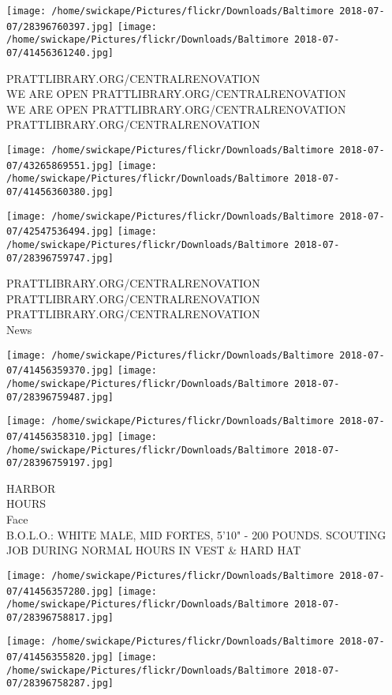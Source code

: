 \documentclass[10pt,letterpaper]{article}
\begin{document}
\texttt{[image: /home/swickape/Pictures/flickr/Downloads/Baltimore 2018-07-07/28396760397.jpg]}
\texttt{[image: /home/swickape/Pictures/flickr/Downloads/Baltimore 2018-07-07/41456361240.jpg]}

PRATTLIBRARY.ORG/CENTRALRENOVATION\\
WE ARE OPEN PRATTLIBRARY.ORG/CENTRALRENOVATION\\
WE ARE OPEN PRATTLIBRARY.ORG/CENTRALRENOVATION\\
PRATTLIBRARY.ORG/CENTRALRENOVATION
\pagebreak

\texttt{[image: /home/swickape/Pictures/flickr/Downloads/Baltimore 2018-07-07/43265869551.jpg]}
\texttt{[image: /home/swickape/Pictures/flickr/Downloads/Baltimore 2018-07-07/41456360380.jpg]}

\texttt{[image: /home/swickape/Pictures/flickr/Downloads/Baltimore 2018-07-07/42547536494.jpg]}
\texttt{[image: /home/swickape/Pictures/flickr/Downloads/Baltimore 2018-07-07/28396759747.jpg]}

PRATTLIBRARY.ORG/CENTRALRENOVATION\\
PRATTLIBRARY.ORG/CENTRALRENOVATION\\
PRATTLIBRARY.ORG/CENTRALRENOVATION\\
News
\pagebreak

\texttt{[image: /home/swickape/Pictures/flickr/Downloads/Baltimore 2018-07-07/41456359370.jpg]}
\texttt{[image: /home/swickape/Pictures/flickr/Downloads/Baltimore 2018-07-07/28396759487.jpg]}

\texttt{[image: /home/swickape/Pictures/flickr/Downloads/Baltimore 2018-07-07/41456358310.jpg]}
\texttt{[image: /home/swickape/Pictures/flickr/Downloads/Baltimore 2018-07-07/28396759197.jpg]}

HARBOR\\
HOURS\\
Face\\
B.O.L.O.: WHITE MALE, MID FORTES, 5'10" {-} 200 POUNDS.  SCOUTING JOB DURING NORMAL HOURS IN VEST \& HARD HAT
\pagebreak

\texttt{[image: /home/swickape/Pictures/flickr/Downloads/Baltimore 2018-07-07/41456357280.jpg]}
\texttt{[image: /home/swickape/Pictures/flickr/Downloads/Baltimore 2018-07-07/28396758817.jpg]}

\texttt{[image: /home/swickape/Pictures/flickr/Downloads/Baltimore 2018-07-07/41456355820.jpg]}
\texttt{[image: /home/swickape/Pictures/flickr/Downloads/Baltimore 2018-07-07/28396758287.jpg]}
\end{document}
